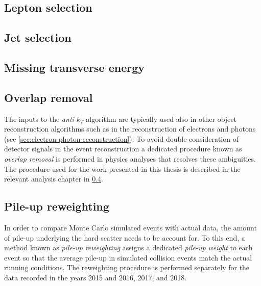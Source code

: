 
\subsection{Lepton selection}
\subsection{Jet selection}


\subsection{Missing transverse energy}
\subsection{Overlap removal}
\label{subsec:overlap-removal}

The inputs to the \emph{anti-$k_T$} algorithm are typically used also in other object reconstruction algorithms such as in the reconstruction of electrons and photons (see \cref{sec:electron-photon-reconstruction}).
To avoid double consideration of detector signals in the event reconstruction a dedicated procedure known as \emph{overlap removal} is performed in physics analyses that resolves these ambiguities. The procedure used for the work presented in this thesis is described in the relevant analysis chapter in \cref{subsec:overlap-removal}.


\subsection{Pile-up reweighting}
In order to compare Monte Carlo simulated events with actual data, the amount of pile-up underlying the hard scatter needs to be account for.
To this end, a method known as \emph{pile-up reweighting} assigns a dedicated \emph{pile-up weight} to each event so that the average pile-up in simulated collision events match the actual running conditions. The reweighting procedure is performed separately for the data recorded in the years 2015 and 2016, 2017, and 2018.
